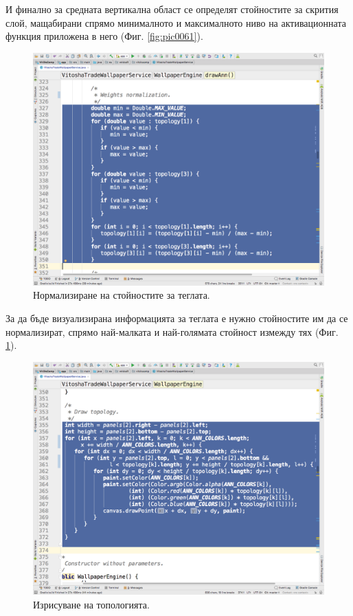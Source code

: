 \documentclass[book,14pt,oneside,openany]{memoir}
\begin{document}
И финално за средната вертикална област се определят стойностите за скрития слой, мащабирани спрямо минималното и максималното ниво на активационната функция приложена в него (Фиг. \ref{fig:pic0061}).

\begin{figure}[h]
  \centering
  \includegraphics[height=0.45\pdfpageheight]{pic0062}
  \caption{Нормализиране на стойностите за теглата.}
\label{fig:pic0062}
\end{figure}
\FloatBarrier

За да бъде визуализирана информацията за теглата е нужно стойностите им да се нормализират, спрямо най-малката и най-голямата стойност измежду тях (Фиг. \ref{fig:pic0062}).

\begin{figure}[h]
  \centering
  \includegraphics[height=0.45\pdfpageheight]{pic0063}
  \caption{Изрисуване на топологията.}
\label{fig:pic0063}
\end{figure}
\FloatBarrier
\end{document}
